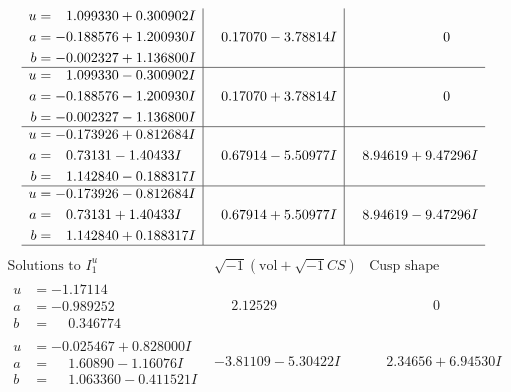 \documentclass[1p]{elsarticle_modified}
\theoremstyle{definition}
\newcommand{\I}{\sqrt{-1}}
\begin{document}
$$\begin{array}{c|c|c}
\begin{aligned}
u &= \phantom{-}1.099330 + 0.300902 I \\
a &= -0.188576 + 1.200930 I \\
b &= -0.002327 + 1.136800 I\end{aligned}
 & \phantom{-}0.17070 - 3.78814 I & \phantom{-0.000000 } 0 \\ \hline\begin{aligned}
u &= \phantom{-}1.099330 - 0.300902 I \\
a &= -0.188576 - 1.200930 I \\
b &= -0.002327 - 1.136800 I\end{aligned}
 & \phantom{-}0.17070 + 3.78814 I & \phantom{-0.000000 } 0 \\ \hline\begin{aligned}
u &= -0.173926 + 0.812684 I \\
a &= \phantom{-}0.73131 - 1.40433 I \\
b &= \phantom{-}1.142840 - 0.188317 I\end{aligned}
 & \phantom{-}0.67914 - 5.50977 I & \phantom{-}8.94619 + 9.47296 I \\ \hline\begin{aligned}
u &= -0.173926 - 0.812684 I \\
a &= \phantom{-}0.73131 + 1.40433 I \\
b &= \phantom{-}1.142840 + 0.188317 I\end{aligned}
 & \phantom{-}0.67914 + 5.50977 I & \phantom{-}8.94619 - 9.47296 I\\
 \hline 
 \end{array}$$\newpage$$\begin{array}{c|c|c}  
\text{Solutions to }I^u_{1}& \I (\text{vol} + \sqrt{-1}CS) & \text{Cusp shape}\\
 \hline 
\begin{aligned}
u &= -1.17114\phantom{ +0.000000I} \\
a &= -0.989252\phantom{ +0.000000I} \\
b &= \phantom{-}0.346774\phantom{ +0.000000I}\end{aligned}
 & \phantom{-}2.12529\phantom{ +0.000000I} & \phantom{-0.000000 } 0 \\ \hline\begin{aligned}
u &= -0.025467 + 0.828000 I \\
a &= \phantom{-}1.60890 - 1.16076 I \\
b &= \phantom{-}1.063360 - 0.411521 I\end{aligned}
 & -3.81109 - 5.30422 I & \phantom{-}2.34656 + 6.94530 I \\ \hline\begin{aligned}

\end{aligned}
\end{array}$$
\end{document}
